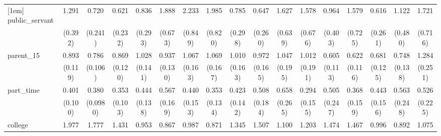 {\begin{tabular}{l*{16}{c}}
[1em]
public\_servant      &       1.291         &       0.720         &       0.621         &       0.836         &       1.888         &       2.233\sym{*}  &       1.985         &       0.785         &       0.647         &       1.627         &       1.578         &       0.964         &       1.579         &       0.616         &       1.122         &       1.721         \\
                    &     (0.392)         &     (0.241)         &     (0.232)         &     (0.293)         &     (0.673)         &     (0.849)         &     (0.820)         &     (0.298)         &     (0.260)         &     (0.639)         &     (0.676)         &     (0.403)         &     (0.725)         &     (0.261)         &     (0.480)         &     (0.716)         \\
[1em]
parent\_15           &       0.893         &       0.786         &       0.869         &       1.028         &       0.937         &       1.067         &       1.069         &       1.010         &       0.972         &       1.047         &       1.012         &       0.605\sym{**} &       0.622\sym{*}  &       0.681\sym{*}  &       0.748         &       1.284         \\
                    &     (0.119)         &     (0.106)         &     (0.120)         &     (0.141)         &     (0.130)         &     (0.163)         &     (0.167)         &     (0.163)         &     (0.165)         &     (0.195)         &     (0.191)         &     (0.113)         &     (0.116)         &     (0.125)         &     (0.138)         &     (0.251)         \\
[1em]
part\_time           &       0.401\sym{***}&       0.380\sym{***}&       0.353\sym{***}&       0.444\sym{**} &       0.567         &       0.440\sym{*}  &       0.353\sym{**} &       0.423\sym{*}  &       0.508         &       0.658         &       0.294\sym{*}  &       0.505         &       0.368\sym{*}  &       0.443\sym{*}  &       0.563         &       0.526         \\
                    &     (0.100)         &    (0.0980)         &     (0.103)         &     (0.138)         &     (0.169)         &     (0.153)         &     (0.134)         &     (0.142)         &     (0.184)         &     (0.265)         &     (0.155)         &     (0.247)         &     (0.159)         &     (0.156)         &     (0.248)         &     (0.225)         \\
[1em]
college             &       1.977\sym{***}&       1.777\sym{**} &       1.431         &       0.953         &       0.867         &       0.987         &       0.871         &       1.345         &       1.507         &       1.100         &       1.203         &       1.474         &       1.467         &       0.996         &       0.892         &       1.075         \\

\end{tabular}}
